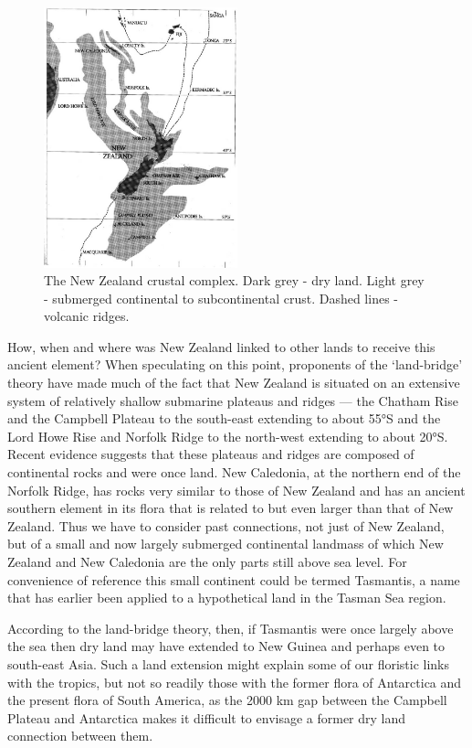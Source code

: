 \begin{figure}
	\includegraphics[width=0.5\textwidth]{graphics/figure2crust.jpg}
	\centering
	\caption[The New Zealand crustal complex]{The New Zealand crustal complex.
Dark grey - dry land.
Light grey - submerged continental to subcontinental crust.
Dashed lines - volcanic ridges.}
	\label{fig:2crust}
\end{figure}

How, when and where was New Zealand linked to other lands to receive this ancient element? When speculating on this point, proponents of the `land-bridge' theory have made much of the fact that New Zealand is situated on an extensive system of relatively shallow submarine plateaus and ridges — the Chatham Rise and the Campbell Plateau to the south-east extending to about 55°S and the Lord Howe Rise and Norfolk Ridge to the north-west extending to about 20°S.
Recent evidence suggests that these plateaus and ridges are composed of continental rocks and were once land.
New Caledonia, at the northern end of the Norfolk Ridge, has rocks very similar to those of New Zealand and has an ancient southern element in its flora that is related to but even larger than that of New Zealand.
Thus we have to consider past connections, not just of New Zealand, but of a small and now largely submerged continental landmass of which New Zealand and New Caledonia are the only parts still above sea level.
For convenience of reference this small continent could be termed Tasmantis, a name that has earlier been applied to a hypothetical land in the Tasman Sea region.

According to the land-bridge theory, then, if Tasmantis were once largely above the sea then dry land may have extended to New Guinea and perhaps even to south-east Asia.
Such a land extension might explain some of our floristic links with the tropics, but not so readily those with the former flora of Antarctica and the present flora of South America, as the 2000 km gap between the Campbell Plateau and Antarctica makes it difficult to envisage a former dry land connection between them.

